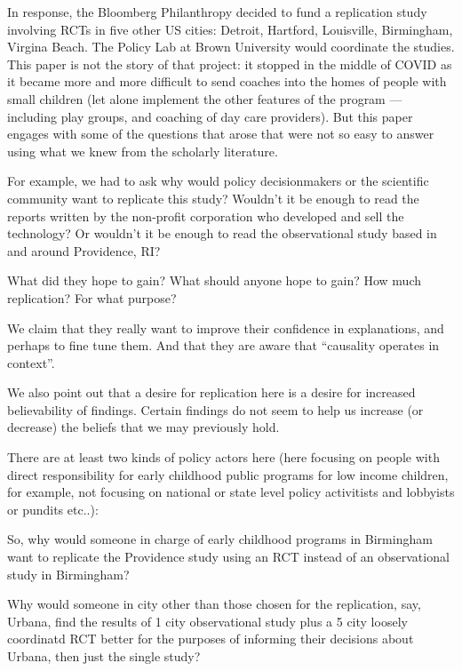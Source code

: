 \documentclass[
]{article}
\begin{document}
In response, the Bloomberg Philanthropy decided to fund a replication
study involving RCTs in five other US cities: Detroit, Hartford,
Louisville, Birmingham, Virgina Beach. The Policy Lab at Brown
University would coordinate the studies. This paper is not the story of
that project: it stopped in the middle of COVID as it became more and
more difficult to send coaches into the homes of people with small
children (let alone implement the other features of the program ---
including play groups, and coaching of day care providers). But this
paper engages with some of the questions that arose that were not so
easy to answer using what we knew from the scholarly literature.

For example, we had to ask why would policy decisionmakers or the
scientific community want to replicate this study? Wouldn't it be enough
to read the reports written by the non-profit corporation who developed
and sell the technology? Or wouldn't it be enough to read the
observational study based in and around Providence, RI?

What did they hope to gain? What should anyone hope to gain? How much
replication? For what purpose?

We claim that they really want to improve their confidence in
explanations, and perhaps to fine tune them. And that they are aware
that ``causality operates in context''.

We also point out that a desire for replication here is a desire for
increased believability of findings. Certain findings do not seem to
help us increase (or decrease) the beliefs that we may previously hold.

There are at least two kinds of policy actors here (here focusing on
people with direct responsibility for early childhood public programs
for low income children, for example, not focusing on national or state
level policy activitists and lobbyists or pundits etc..):

So, why would someone in charge of early childhood programs in
Birmingham want to replicate the Providence study using an RCT instead
of an observational study in Birmingham?

Why would someone in city other than those chosen for the replication,
say, Urbana, find the results of 1 city observational study plus a 5
city loosely coordinatd RCT better for the purposes of informing their
decisions about Urbana, then just the single study?
\end{document}
